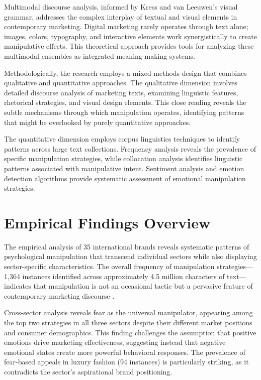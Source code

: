 Multimodal discourse analysis, informed by Kress and van Leeuwen's visual grammar, addresses the complex interplay of textual and visual elements in contemporary marketing. Digital marketing rarely operates through text alone; images, colors, typography, and interactive elements work synergistically to create manipulative effects. This theoretical approach provides tools for analyzing these multimodal ensembles as integrated meaning-making systems.

Methodologically, the research employs a mixed-methods design that combines qualitative and quantitative approaches. The qualitative dimension involves detailed discourse analysis of marketing texts, examining linguistic features, rhetorical strategies, and visual design elements. This close reading reveals the subtle mechanisms through which manipulation operates, identifying patterns that might be overlooked by purely quantitative approaches.

The quantitative dimension employs corpus linguistics techniques to identify patterns across large text collections. Frequency analysis reveals the prevalence of specific manipulation strategies, while collocation analysis identifies linguistic patterns associated with manipulative intent. Sentiment analysis and emotion detection algorithms provide systematic assessment of emotional manipulation strategies.

\section{Empirical Findings Overview}
\label{sec:findings_overview}

The empirical analysis of 35 international brands reveals systematic patterns of psychological manipulation that transcend individual sectors while also displaying sector-specific characteristics. The overall frequency of manipulation strategies—1,364 instances identified across approximately 4.5 million characters of text—indicates that manipulation is not an occasional tactic but a pervasive feature of contemporary marketing discourse \cite{fairclough2015language}.

Cross-sector analysis reveals fear as the universal manipulator, appearing among the top two strategies in all three sectors despite their different market positions and consumer demographics. This finding challenges the assumption that positive emotions drive marketing effectiveness, suggesting instead that negative emotional states create more powerful behavioral responses. The prevalence of fear-based appeals in luxury fashion (94 instances) is particularly striking, as it contradicts the sector's aspirational brand positioning.

